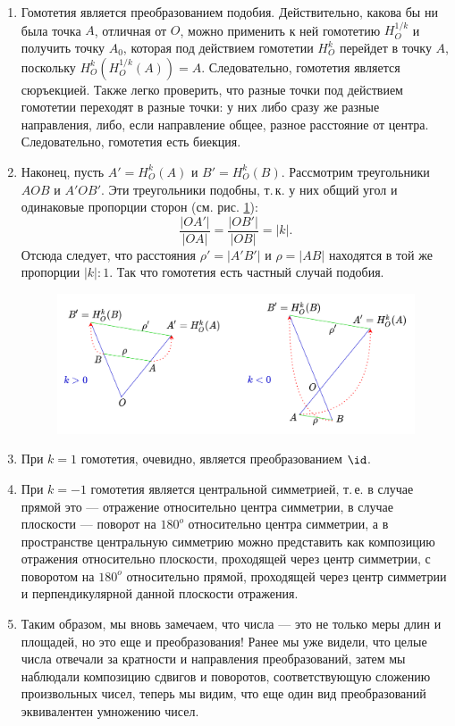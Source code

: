 \begin{enumerate}
\item Гомотетия является преобразованием подобия. Действительно, какова бы ни была точка $A$, отличная от $O$, можно применить к ней гомотетию $H_O^{1/k}$ и получить точку $A_0$, которая под действием гомотетии $H_O^k$ перейдет в точку $A$, поскольку $H_O^k(H_O^{1/k}(A))=A$. Следовательно, гомотетия является сюръекцией. Также легко проверить, что разные точки под действием гомотетии переходят в разные точки: у них либо сразу же разные направления, либо, если направление общее, разное расстояние от центра. Следовательно, гомотетия есть биекция.

\item Наконец, пусть $A'=H_O^k(A)$ и $B'=H_O^k(B)$. Рассмотрим треугольники $AOB$ и $A'OB'$. Эти треугольники подобны, т.\,к. у них общий угол и одинаковые пропорции сторон (см. рис. \ref{Homotet}):
$$
\frac{|OA'|}{|OA|}=\frac{|OB'|}{|OB|}=|k|.
$$
Отсюда следует, что расстояния $\rho'=|A'B'|$ и $\rho=|AB|$ находятся в той же пропорции $|k|:1$.
Так что гомотетия есть частный случай подобия.

\begin{figure}[hbt!]
\begin{center}
\includegraphics[scale=0.2]{Homotet.png}
\end{center}\caption{}\label{Homotet}
\end{figure}


\item При $k=1$ гомотетия, очевидно, является преобразованием $\id$.
\item При $k=-1$ гомотетия является центральной симметрией, т.\,е. в случае прямой это --- отражение относительно центра симметрии, в случае плоскости --- поворот на $180^o$ относительно центра симметрии, а в пространстве центральную симметрию можно представить как композицию отражения относительно плоскости, проходящей через центр симметрии, с поворотом на $180^o$ относительно прямой, проходящей через центр симметрии и перпендикулярной данной плоскости отражения.
\item Таким образом, мы вновь замечаем, что числа --- это не только меры длин и площадей, но это еще и преобразования! Ранее мы уже видели, что целые числа отвечали за кратности и направления преобразований, затем мы наблюдали композицию сдвигов и поворотов, соответствующую сложению произвольных чисел, теперь мы видим, что еще один вид преобразований эквивалентен умножению чисел.

\end{enumerate}



